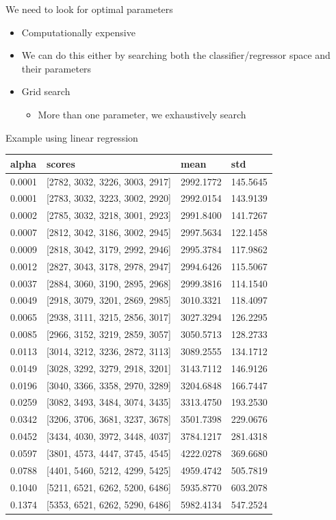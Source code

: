 \documentclass[obeyspaces,aspectratio=43]{beamer}
\providecommand{\tightlist}{%
  \setlength{\itemsep}{0pt}\setlength{\parskip}{0pt}}
\begin{document}
\begin{frame}{We need to look for optimal parameters}

\begin{itemize}
\tightlist
\item
  Computationally expensive
\item
  We can do this either by searching both the classifier/regressor space
  and their parameters
\item
  Grid search

  \begin{itemize}
  \tightlist
  \item
    More than one parameter, we exhaustively search
  \end{itemize}
\end{itemize}

\end{frame}

\begin{frame}{Example using linear regression}

\tiny

\begin{longtable}[c]{@{}llll@{}}
\toprule
alpha & scores & mean & std\tabularnewline
\midrule
\endhead
0.0001 & {[}2782, 3032, 3226, 3003, 2917{]} & 2992.1772 &
145.5645\tabularnewline
0.0001 & {[}2783, 3032, 3223, 3002, 2920{]} & 2992.0154 &
143.9139\tabularnewline
0.0002 & {[}2785, 3032, 3218, 3001, 2923{]} & 2991.8400 &
141.7267\tabularnewline
0.0007 & {[}2812, 3042, 3186, 3002, 2945{]} & 2997.5634 &
122.1458\tabularnewline
0.0009 & {[}2818, 3042, 3179, 2992, 2946{]} & 2995.3784 &
117.9862\tabularnewline
0.0012 & {[}2827, 3043, 3178, 2978, 2947{]} & 2994.6426 &
115.5067\tabularnewline
0.0037 & {[}2884, 3060, 3190, 2895, 2968{]} & 2999.3816 &
114.1540\tabularnewline
0.0049 & {[}2918, 3079, 3201, 2869, 2985{]} & 3010.3321 &
118.4097\tabularnewline
0.0065 & {[}2938, 3111, 3215, 2856, 3017{]} & 3027.3294 &
126.2295\tabularnewline
0.0085 & {[}2966, 3152, 3219, 2859, 3057{]} & 3050.5713 &
128.2733\tabularnewline
0.0113 & {[}3014, 3212, 3236, 2872, 3113{]} & 3089.2555 &
134.1712\tabularnewline
0.0149 & {[}3028, 3292, 3279, 2918, 3201{]} & 3143.7112 &
146.9126\tabularnewline
0.0196 & {[}3040, 3366, 3358, 2970, 3289{]} & 3204.6848 &
166.7447\tabularnewline
0.0259 & {[}3082, 3493, 3484, 3074, 3435{]} & 3313.4750 &
193.2530\tabularnewline
0.0342 & {[}3206, 3706, 3681, 3237, 3678{]} & 3501.7398 &
229.0676\tabularnewline
0.0452 & {[}3434, 4030, 3972, 3448, 4037{]} & 3784.1217 &
281.4318\tabularnewline
0.0597 & {[}3801, 4573, 4447, 3745, 4545{]} & 4222.0278 &
369.6680\tabularnewline
0.0788 & {[}4401, 5460, 5212, 4299, 5425{]} & 4959.4742 &
505.7819\tabularnewline
0.1040 & {[}5211, 6521, 6262, 5200, 6486{]} & 5935.8770 &
603.2078\tabularnewline
0.1374 & {[}5353, 6521, 6262, 5290, 6486{]} & 5982.4134 &
547.2524\tabularnewline
\bottomrule
\end{longtable}

\end{frame}
\end{document}
